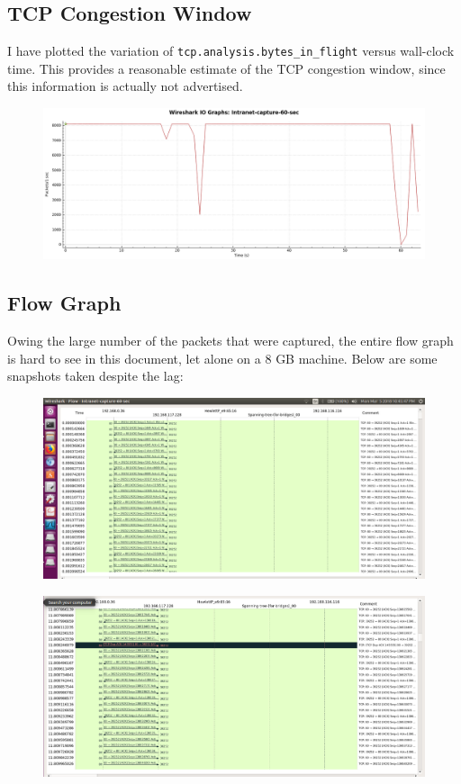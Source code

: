 \documentclass{article}
\begin{document}
\subsection{TCP Congestion Window}
\begin{flushleft}
I have plotted the variation of \texttt{tcp.analysis.bytes\_in\_flight} versus wall-clock time. This provides a reasonable estimate of the TCP congestion window, since this information is actually not advertised.
\begin{figure}[H]
\centering
\includegraphics[width=0.75\linewidth]{tcp-CWND-Intranet.png}
\end{figure}
\end{flushleft}

\subsection{Flow Graph}
\begin{flushleft}
Owing the large number of the packets that were captured, the entire flow graph is hard to see in this document, let alone on a 8 GB machine. Below are some snapshots taken despite the lag:
\begin{figure}[H]
\centering
\includegraphics[width=0.6\linewidth]{flow-graph-1-Intranet.png}
\end{figure}
\begin{figure}[H]
\centering
\includegraphics[width=0.6\linewidth]{flow-graph-2-Intranet.png}
\end{figure}
\end{flushleft}
\end{document}
